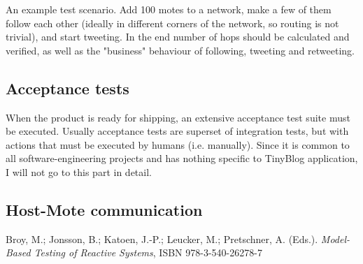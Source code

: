 \documentclass[english,11pt]{article}
\numberwithin{equation}{section}
\begin{document}
An example test scenario. Add 100 motes to a network, make a few of them follow
each other (ideally in different corners of the network, so routing is not
trivial), and start tweeting. In the end number of hops should be calculated and
verified, as well as the "business" behaviour of following, tweeting and
retweeting.

\subsection{Acceptance tests}

When the product is ready for shipping, an extensive acceptance test suite must
be executed. Usually acceptance tests are superset of integration tests, but
with actions that must be executed by humans (i.e. manually). Since it is common
to all software-engineering projects and has nothing specific to TinyBlog
application, I will not go to this part in detail.

\subsection{Host-Mote communication}

\begin{thebibliography}{9}

        Broy, M.; Jonsson, B.; Katoen, J.-P.; Leucker, M.; Pretschner, A.
        (Eds.). \emph{Model-Based Testing of Reactive Systems}, ISBN
        978-3-540-26278-7

\end{thebibliography}
\end{document}

